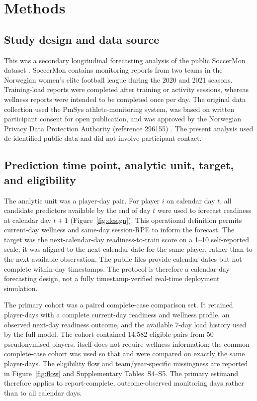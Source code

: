 \section{Methods}
\subsection{Study design and data source}
This was a secondary longitudinal forecasting analysis of the public SoccerMon dataset \citep{Midoglu2024,SoccerMonZenodo}. SoccerMon contains monitoring reports from two teams in the Norwegian women's elite football league during the 2020 and 2021 seasons. Training-load reports were completed after training or activity sessions, whereas wellness reports were intended to be completed once per day. The original data collection used the PmSys athlete-monitoring system, was based on written participant consent for open publication, and was approved by the Norwegian Privacy Data Protection Authority (reference 296155) \citep{Midoglu2024}. The present analysis used de-identified public data and did not involve participant contact.

\subsection{Prediction time point, analytic unit, target, and eligibility}
The analytic unit was a player-day pair. For player $i$ on calendar day $t$, all candidate predictors available by the end of day $t$ were used to forecast readiness at calendar day $t+1$ (Figure~\ref{fig:design}). This operational definition permits current-day wellness and same-day session-RPE to inform the forecast. The target was the next-calendar-day readiness-to-train score on a 1--10 self-reported scale; it was aligned to the next calendar date for the same player, rather than to the next available observation. The public files provide calendar dates but not complete within-day timestamps. The protocol is therefore a calendar-day forecasting design, not a fully timestamp-verified real-time deployment simulation.

The primary cohort was a paired complete-case comparison set. It retained player-days with a complete current-day readiness and wellness profile, an observed next-day readiness outcome, and the available 7-day load history used by the full model. The cohort contained 14,582 eligible pairs from 50 pseudonymised players. \Pzero{} itself does not require wellness information; the common complete-case cohort was used so that \Pzero{} and \Pone{} were compared on exactly the same player-days. The eligibility flow and team/year-specific missingness are reported in Figure~\ref{fig:flow} and Supplementary Tables~S4--S5. The primary estimand therefore applies to report-complete, outcome-observed monitoring days rather than to all calendar days.

